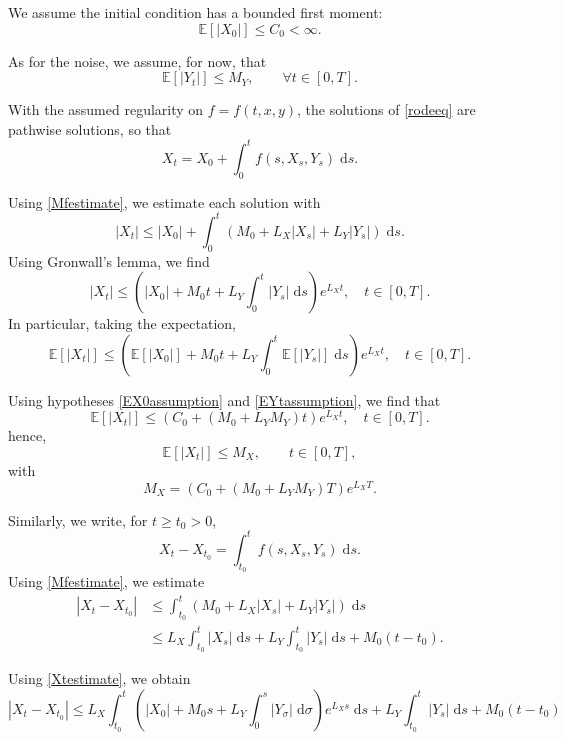 \documentclass[reqno,12pt]{amsart}
\theoremstyle{plain}%
\theoremstyle{definition}
\begin{document}
We assume the initial condition has a bounded first moment:
\begin{equation}
    \label{EX0assumption}
    \mathbb{E}[|X_0|] \leq C_0 < \infty.
\end{equation}

As for the noise, we assume, for now, that
\begin{equation}
    \label{EYtassumption}
    \mathbb{E}[|Y_t|] \leq M_Y, \qquad \forall t\in [0, T].
\end{equation}

With the assumed regularity on $f=f(t, x, y)$, the solutions of \eqref{rodeeq} are pathwise solutions, so that
$$
X_t = X_0 + \int_0^t f(s, X_s, Y_s) \;\mathrm{d}s.
$$

Using \eqref{Mfestimate}, we estimate each solution with
$$
    |X_t|  \leq |X_0| + \int_0^t (M_0 + L_X |X_s| + L_Y |Y_s|) \;\mathrm{d}s.
$$
Using Gronwall's lemma, we find
\begin{equation}
    \label{Xtestimate}
    |X_t| \leq \left( |X_0| + M_0 t  + L_Y \int_0^t |Y_s| \;\mathrm{d}s\right) e^{L_X t}, \quad t \in [0, T].
\end{equation}
In particular, taking the expectation, 
$$
    \mathbb{E}[|X_t|] \leq \left( \mathbb{E}[|X_0|] + M_0 t  + L_Y \int_0^t \mathbb{E}[|Y_s|] \;\mathrm{d}s\right) e^{L_X t}, \quad t \in [0, T].
$$

Using hypotheses \eqref{EX0assumption} and \eqref{EYtassumption}, we find that
$$
\mathbb{E}[|X_t|] \leq \left( C_0 + (M_0 + L_Y M_Y) t \right) e^{L_X t}, \quad t \in [0, T].
$$
hence,
\begin{equation}
    \label{EXtestimate}
    \mathbb{E}[|X_t|] \leq M_X, \qquad t \in [0, T],
\end{equation}
with
\begin{equation}
    \label{MXt}
    M_X = (C_0 + (M_0 + L_Y M_Y)T)e^{L_X T}.
\end{equation}


Similarly, we write, for $t \geq t_0 > 0$,
$$
X_t - X_{t_0} = \int_{t_0}^t f(s, X_s, Y_s) \;\mathrm{d}s.
$$
Using \eqref{Mfestimate}, we estimate
\begin{align*}
    |X_t - X_{t_0}| & \leq \int_{t_0}^t \left(M_0 + L_X |X_s| + L_Y|Y_s| \right)\;\mathrm{d}s \\
    & \leq L_X \int_{t_0}^t |X_s| \;\mathrm{d}s + L_Y\int_{t_0}^t |Y_s|\;\mathrm{d}s + M_0(t - t_0).
\end{align*}

Using \eqref{Xtestimate}, we obtain
\begin{equation}
    |X_t - X_{t_0}| \leq L_X \int_{t_0}^t \left( |X_0| + M_0 s  + L_Y \int_0^s |Y_\sigma| \;\mathrm{d}\sigma\right) e^{L_X s} \;\mathrm{d}s + L_Y\int_{t_0}^t |Y_s|\;\mathrm{d}s + M_0(t - t_0)
\end{equation}
\end{document}
